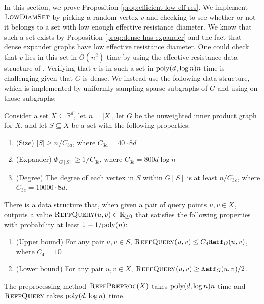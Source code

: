 In this section, we prove Proposition \ref{prop:efficient-low-eff-res}. We implement $\textsc{LowDiamSet}$ by picking a random vertex $v$ and checking to see whether or not it belongs to a set with low enough effective resistance diameter. We know that such a set exists by Proposition \ref{prop:dense-has-expander} and the fact that dense expander graphs have low effective resistance diameter. One could check that $v$ lies in this set in $\tilde{O}(n^2)$ time by using the effective resistance data structure of \cite{ss11}. Verifying that $v$ is in such a set in $\mathrm{poly}(d,\log n) n$ time is challenging given that $G$ is dense. We instead use the following data structure, which is implemented by uniformly sampling sparse subgraphs of $G$ and using \cite{ss11} on those subgraphs:

\begin{proposition}\label{prop:weak-sampling}
Consider a set $X\subseteq \mathbb{R}^d$, let $n = |X|$, let $G$ be the unweighted inner product graph for $X$, and let $S\subseteq X$ be a set with the following properties:

\begin{enumerate}
    \item (Size) $|S|\ge n/C_{3a}$, where $C_{3a} = 40\cdot 8d$
    \item (Expander) $\Phi_{G[S]}\ge 1/C_{3b}$, where $C_{3b} = 800d\log n$
    \item (Degree) The degree of each vertex in $S$ within $G[S]$ is at least $n/C_{3c}$, where $C_{3c} = 10000\cdot 8d$.
\end{enumerate}

There is a data structure that, when given a pair of query points $u,v\in X$, outputs a value $\textsc{ReffQuery}(u,v)\in \mathbb{R}_{\ge 0}$ that satisfies the following properties with probability at least $1 - 1/\mathrm{poly}(n)$:

\begin{enumerate}
    \item (Upper bound) For any pair $u,v\in S$, $\textsc{ReffQuery}(u,v) \le C_4\mathtt{Reff}_G(u,v)$, where $C_4 = 10$
    \item (Lower bound) For any pair $u,v\in X$, $\textsc{ReffQuery}(u,v) \ge \mathtt{Reff}_G(u,v)/2$.
\end{enumerate}

The preprocessing method $\textsc{ReffPreproc}(X)$ takes $\mathrm{poly}(d,\log n) n$ time and $\textsc{ReffQuery}$ takes $\mathrm{poly}(d,\log n)$ time.
\end{proposition}

